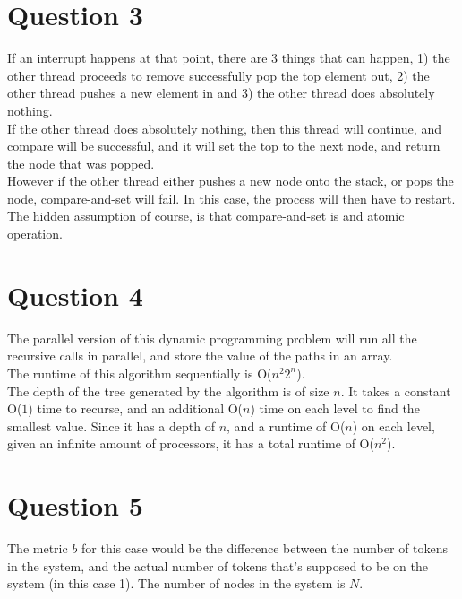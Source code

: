 \documentclass[]{article}
\begin{document}
\section{Question 3}
If an interrupt happens at that point, there are 3 things that can happen, 1) the other thread proceeds to remove successfully pop the top element out, 2) the other thread pushes a new element in and 3) the other thread does absolutely nothing.\\

If the other thread does absolutely nothing, then this thread will continue, and compare will be successful, and it will set the top to the next node, and return the node that was popped.\\ 

However if the other thread either pushes a new node onto the stack, or pops the node, compare-and-set will fail. In this case, the process will then have to restart.\\

The hidden assumption of course, is that compare-and-set is and atomic operation.\\

\section{Question 4}
The parallel version of this dynamic programming problem will run all the recursive calls in parallel, and store the value of the paths in an array.\\

The runtime of this algorithm sequentially is O($n^2 2^n$).\\

The depth of the tree generated by the algorithm is of size $n$. It takes a constant O($1$) time to recurse, and an additional O($n$) time on each level to find the smallest value. Since it has a depth of $n$, and a runtime of O($n$) on each level, given an infinite amount of processors, it has a total runtime of O($n^2$).\\

\section{Question 5}
The metric $b$ for this case would be the difference between the number of tokens in the system, and the actual number of tokens that's supposed to be on the system (in this case 1). The number of nodes in the system is $N$.\\
\end{document}

